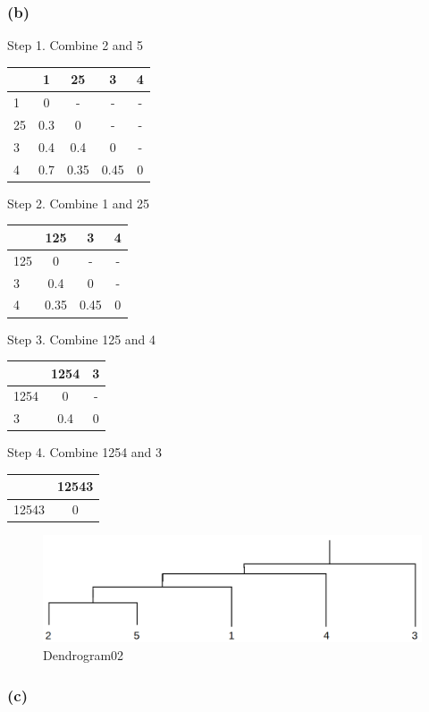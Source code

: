 \documentclass[11pt]{article}
\begin{document}
    \hypertarget{b}{%
\subsubsection{(b)}\label{b}}

Step 1. Combine 2 and 5

\begin{longtable}[]{@{}lcccc@{}}
\toprule
& 1 & 25 & 3 & 4\tabularnewline
\midrule
\endhead
1 & 0 & - & - & -\tabularnewline
25 & 0.3 & 0 & - & -\tabularnewline
3 & 0.4 & 0.4 & 0 & -\tabularnewline
4 & 0.7 & 0.35 & 0.45 & 0\tabularnewline
\bottomrule
\end{longtable}

Step 2. Combine 1 and 25

\begin{longtable}[]{@{}lccc@{}}
\toprule
& 125 & 3 & 4\tabularnewline
\midrule
\endhead
125 & 0 & - & -\tabularnewline
3 & 0.4 & 0 & -\tabularnewline
4 & 0.35 & 0.45 & 0\tabularnewline
\bottomrule
\end{longtable}

Step 3. Combine 125 and 4

\begin{longtable}[]{@{}lcc@{}}
\toprule
& 1254 & 3\tabularnewline
\midrule
\endhead
1254 & 0 & -\tabularnewline
3 & 0.4 & 0\tabularnewline
\bottomrule
\end{longtable}

Step 4. Combine 1254 and 3

\begin{longtable}[]{@{}lc@{}}
\toprule
& 12543\tabularnewline
\midrule
\endhead
12543 & 0\tabularnewline
\bottomrule
\end{longtable}

\begin{figure}
\centering
\includegraphics{./dendrogram02.png}
\caption{Dendrogram02}
\end{figure}

    \hypertarget{c}{%
\subsubsection{(c)}\label{c}}
\end{document}
